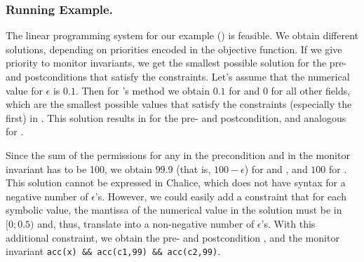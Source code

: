 \documentclass{llncs}
\begin{document}
\goup
\goup
\subsubsection{Running Example.} 

The linear programming system for our example
() is feasible. We obtain
different solutions, depending on priorities encoded in the objective
function. If we give priority to monitor invariants, we get the
smallest possible solution for the pre- and postconditions that
satisfy the constraints. Let's assume that the numerical value for
$\epsilon$ is $0.1$. Then for 's  method we obtain
$0.1$ for  and $0$ for all other fields,
which are the smallest possible values that satisfy the constraints
(especially the first) in .
This solution results in  for the pre- and
postcondition, and analogous for .

Since the sum of the permissions for any  in the
precondition and in the monitor invariant has to be 100, we obtain
$99.9$ (that is, $100-\epsilon$) for  and
, and $100$ for . This solution cannot
be expressed in Chalice, which does not have syntax for a negative
number of $\epsilon$'s. However, we could easily add a constraint that
for each symbolic value, the mantissa of the numerical value in the
solution must be in $[0;0.5)$ and, thus, translate into a
  non-negative number of $\epsilon$'s. With this additional constraint,
we obtain the pre- and postcondition , and the
monitor invariant \lstinline{acc(x) && acc(c1,99) && acc(c2,99)}.


%
\end{document}
